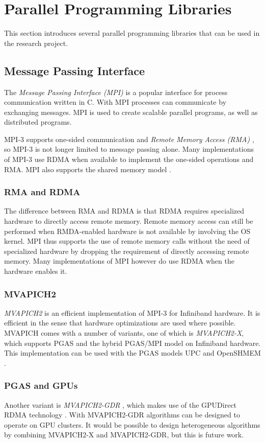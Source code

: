 \section{Parallel Programming Libraries}
This section introduces several parallel programming libraries that can be used in the research project.

\subsection{Message Passing Interface}
The \emph{Message Passing Interface (MPI)} is a popular interface for process communication written in C. With MPI processes can communicate by exchanging messages. MPI is used to create scalable parallel programs, as well as distributed programs.

MPI-3 supports one-sided communication and \emph{Remote Memory Access (RMA)} \cite{conf/sc/GerstenbergerBH13}, so MPI-3 is not longer limited to message passing alone. Many implementations of MPI-3 use RDMA when available to implement the one-sided operations and RMA. MPI also supports the shared memory model \cite{mpi-shared-mem-win}. 

\subsubsection{RMA and RDMA}
The difference between RMA and RDMA is that RDMA requires specialized hardware to directly access remote memory. Remote memory access can still be performed when RMDA-enabled hardware is not available by involving the OS kernel. MPI thus supports the use of remote memory calls without the need of specialized hardware by dropping the requirement of directly accessing remote memory. Many implementations of MPI however do use RDMA when the hardware enables it.

\subsubsection{MVAPICH2}
\emph{MVAPICH2} \cite{mvapich2} is an efficient implementation of MPI-3 for Infiniband hardware. It is efficient in the sense that hardware optimizations are used where possible. MVAPICH comes with a number of variants, one of which is \emph{MVAPICH2-X}, which supports PGAS and the hybrid PGAS/MPI model on Infiniband hardware. This implementation can be used with the PGAS models UPC and OpenSHMEM \cite{implementing_openshmem}. 

\subsubsection{PGAS and GPUs}
Another variant is \emph{MVAPICH2-GDR} \cite{Wang:2011:MOG:1997883.1997893}, which makes use of the GPUDirect RDMA technology \cite{gpudirect}. With MVAPICH2-GDR algorithms can be designed to operate on GPU clusters. It would be possible to design heterogeneous algorithms by combining MVAPICH2-X and MVAPICH2-GDR, but this is future work.

